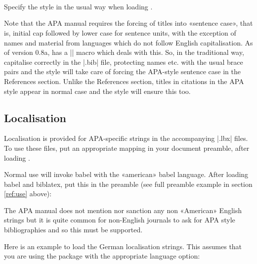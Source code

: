 \documentclass{ltxdockit}
\begin{document}
\noindent{}\\
\\
\\

\noindent Specify the style in the usual way when loading . 

\begin{ltxcode}
\usepackage[american]{babel}
\usepackage{csquotes}
\usepackage[style=apa]{biblatex}
\end{ltxcode}

\noindent Note that the APA manual requires the forcing of titles into
«sentence case», that is, initial cap followed by lower case for sentence
units, with the exception of names and material from languages which do not
follow English capitalisation. As of version 0.8a,  has a
|\MakeSentenceCase| macro which deals with this. So, in the traditional
\bibtex way, capitalise correctly in the |.bib| file, protecting names etc.
with the usual brace pairs and the style will take care of forcing the
APA-style sentence case in the References section. Unlike the References
section, titles in citations in the APA style appear in normal case and the
style will ensure this too.

\subsection{Localisation}

Localisation is provided for APA-specific strings in the accompanying
|.lbx| files. To use these files, put an appropriate mapping in your
document preamble, after loading .

Normal use will invoke babel with the «american» babel language. After
loading babel and biblatex, put this in the preamble (see full preamble
example in section \ref{ref:use} above):

\begin{ltxcode}
\end{ltxcode}

The APA manual does not mention nor sanction any non «American» English
strings but it is quite common for non-English journals to ask for APA style
bibliographies and so this must be supported.

Here is an example to load the German localisation strings. This assumes
that you are using the  package with the appropriate language
option:
\end{document}
